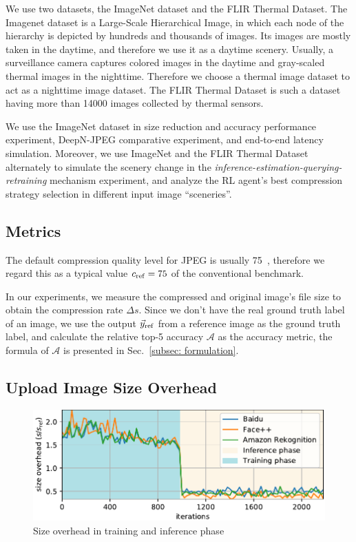 We use two datasets, the ImageNet dataset and the FLIR Thermal Dataset. The Imagenet dataset is a Large-Scale Hierarchical Image, in which each node of the hierarchy is depicted by hundreds and thousands of images. Its images are mostly taken in the daytime, and therefore we use it as a daytime scenery. Usually, a surveillance camera captures colored images in the daytime and gray-scaled thermal images in the nighttime. Therefore we choose a thermal image dataset to act as a nighttime image dataset. The FLIR Thermal Dataset is such a dataset having more than 14000 images collected by thermal sensors.

We use the ImageNet dataset in size reduction and accuracy performance experiment, DeepN-JPEG comparative experiment, and end-to-end latency simulation. Moreover, we use ImageNet and the FLIR Thermal Dataset alternately to simulate the scenery change in the \emph{inference-estimation-querying-retraining} mechanism experiment, and analyze the RL agent's best compression strategy selection in different input image ``sceneries''.

\subsection{Metrics}
\label{subsec:metrics}

The default compression quality level for JPEG is usually 75~\cite{pillow_benchmark,imgmin}, therefore we regard this as a typical value $ c_{\rm ref} = 75 $ of the conventional benchmark. %

In our experiments, we measure the compressed and original image's file size to obtain the compression rate $ \Delta s $. Since we don't have the real ground truth label of an image, we use the output $ \vec{y}_{\rm ref} $ from a reference image as the ground truth label, and calculate the relative top-5 accuracy $ \mathcal{A} $ as the accuracy metric, the formula of $ \mathcal{A} $ is presented in Sec.~\ref{subsec: formulation}.

\subsection{Upload Image Size Overhead}

\begin{figure}[htbp]
    \includegraphics[width=\linewidth]{figures/train_steps_new.pdf}
    \caption{Size overhead in training and inference phase}
    \label{fig: train_steps}
\end{figure}

